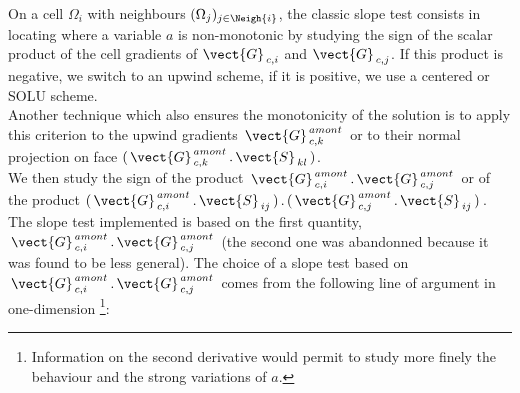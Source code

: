 On a cell $\Omega_i$ with neighbours $(\Omega_j)_{j\in \Neigh{i}}$, the classic slope test 
consists in locating where a variable $a$ is non-monotonic by studying the sign of
the scalar product of the cell gradients of $\vect{G}_{\,c,i}$
and $\vect{G}_{\,c,j}$. If this product is negative, we switch to an upwind scheme, if it is
positive, we use a centered or SOLU scheme.\\
Another technique which also ensures the monotonicity of the solution is
to apply this criterion to the upwind gradients
$\,\vect{G}^{\,amont}_{\,c,k}\,$ or to their normal projection on
face $(\,\vect{G}^{\,amont}_{\,c,k}\,.\,\vect{S}_{\,kl}\,)$.\\
We then study the sign of the product
$\,\vect{G}^{\,amont}_{\,c,i}\,.\,\vect{G}^{\,amont}_{\,c,j}\,$ or of the product 
$(\,\vect{G}^{\,amont}_{\,c,i}\,.\,\vect{S}_{\,ij}\,)\,.\,(\,\vect{G}^{\,amont}_{\,c,j}\,.\,\vect{S}_{\,ij}\,)\,$.
The slope test implemented is based on the first quantity,
$\,\vect{G}^{\,amont}_{\,c,i}\,.\,\vect{G}^{\,amont}_{\,c,j}\,$
(the second one was abandonned because it was found to be less general). The
choice of a slope test based on 
$\,\vect{G}^{\,amont}_{\,c,i}\,.\,\vect{G}^{\,amont}_{\,c,j}\,$
comes from the following line of argument in one-dimension \footnote{Information 
on the second derivative would permit to study more finely the behaviour and the strong 
variations of $a$.}:

